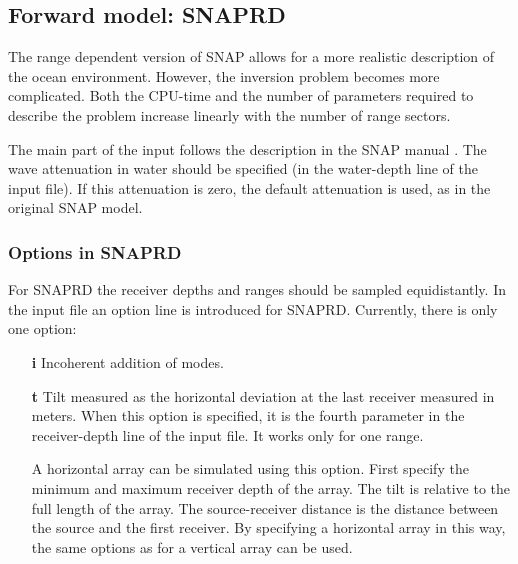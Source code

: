 \documentclass{saclantc}
\begin{document}



\subsection{Forward model: SNAPRD }
 \label{se:snaprd}
The range dependent version of {\sf SNAP} allows for a more realistic
description of the ocean environment. However, the inversion
problem becomes more complicated. Both the CPU-time
 and the number of parameters required to describe the problem 
increase linearly with the number of range sectors. 

The main part of the input follows the description in the {\sf SNAP} manual
\cite{snap}. The wave attenuation in 
water should be specified (in the water-depth line of the input file). 
If this attenuation is zero, the default attenuation
is used, as in the original {\sf SNAP} model.

\subsubsection{Options in SNAPRD}
For {\sf SNAPRD} the receiver depths and ranges should be sampled equidistantly.
In the input file  an option line is introduced for {\sf SNAPRD}. 
Currently, there is only one option:
\begin{itemize}
 \item[\bf i]     Incoherent addition of modes.
 \item[\bf t]     Tilt measured as the horizontal
deviation at the last receiver measured in meters. 
When this option is specified, it is the fourth parameter in
the receiver-depth line of the input file. 
It works only for one range.

A horizontal array can be simulated using this option. First specify
the minimum and maximum receiver depth of the array. The tilt
is relative to the full length of the array. The source-receiver distance
is the distance between the source and the first receiver. By
specifying a horizontal array in this way, the same options as for a
vertical array can be used.
\end{itemize}
\end{document}
